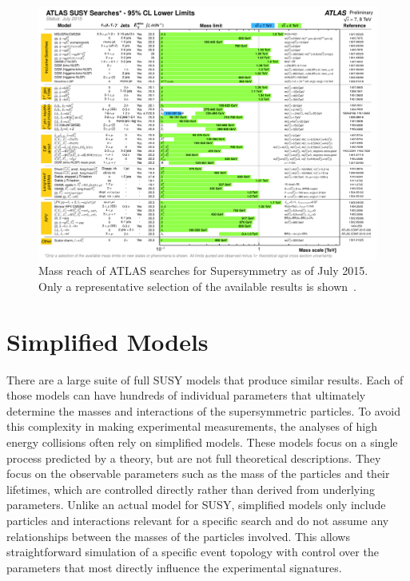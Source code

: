 \begin{figure}
\includegraphics[width=\textwidth]{figures/ATLAS_SUSY_Summary_201507.pdf}
\caption{Mass reach of ATLAS searches for Supersymmetry as of July 2015. Only a representative selection of the available results is shown~\cite{online_susy}.}
\label{fig:susy_summary_2015}
\end{figure}

\section{Simplified Models}

There are a large suite of full \ac{SUSY} models that produce similar results.
Each of those models can have hundreds of individual parameters that ultimately determine the masses and interactions of the supersymmetric particles.
To avoid this complexity in making experimental measurements, the analyses of high energy collisions often rely on simplified models.
These models focus on a single process predicted by a theory, but are not full theoretical descriptions.
They focus on the observable parameters such as the mass of the particles and their lifetimes, which are controlled directly rather than derived from underlying parameters.
Unlike an actual model for \ac{SUSY}, simplified models only include particles and interactions relevant for a specific search and do not assume any relationships between the masses of the particles involved.
This allows straightforward simulation of a specific event topology with control over the parameters that most directly influence the experimental signatures.


